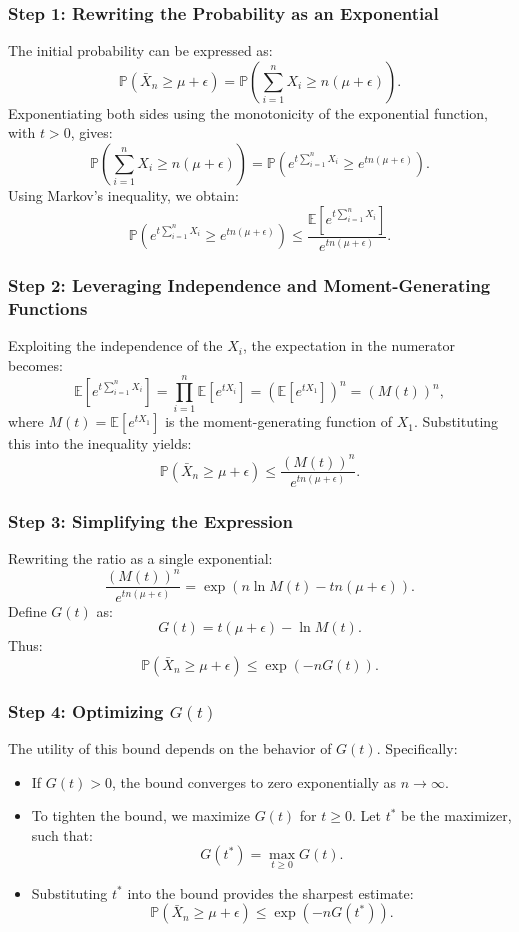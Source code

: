 \subsubsection{Step 1: Rewriting the Probability as an Exponential}
The initial probability can be expressed as:
\[
\mathbb{P}(\bar{X}_n \geq \mu + \epsilon) = \mathbb{P}\left(\sum_{i=1}^n X_i \geq n(\mu + \epsilon)\right).
\]
Exponentiating both sides using the monotonicity of the exponential function, with $t>0$, gives:
\[
\mathbb{P}\left(\sum_{i=1}^n X_i \geq n(\mu + \epsilon)\right) = \mathbb{P}\left(e^{t \sum_{i=1}^n X_i} \geq e^{t n (\mu + \epsilon)}\right).
\]
Using Markov's inequality, we obtain:
\[
\mathbb{P}\left(e^{t \sum_{i=1}^n X_i} \geq e^{t n (\mu + \epsilon)}\right) \leq \frac{\mathbb{E}[e^{t \sum_{i=1}^n X_i}]}{e^{t n (\mu + \epsilon)}}.
\]

\subsubsection{Step 2: Leveraging Independence and Moment-Generating Functions}
Exploiting the independence of the \( X_i \), the expectation in the numerator becomes:
\[
\mathbb{E}\left[e^{t \sum_{i=1}^n X_i}\right] = \prod_{i=1}^n \mathbb{E}\left[e^{t X_i}\right] = \left(\mathbb{E}[e^{t X_1}]\right)^n = \left(M(t)\right)^n,
\]
where \( M(t) = \mathbb{E}[e^{t X_1}] \) is the moment-generating function of \( X_1 \). Substituting this into the inequality yields:
\[
\mathbb{P}(\bar{X}_n \geq \mu + \epsilon) \leq \frac{\left(M(t)\right)^n}{e^{t n (\mu + \epsilon)}}.
\]

\subsubsection{Step 3: Simplifying the Expression}
Rewriting the ratio as a single exponential:
\[
\frac{\left(M(t)\right)^n}{e^{t n (\mu + \epsilon)}} = \exp\left(n \ln M(t) - t n (\mu + \epsilon)\right).
\]
Define \( G(t) \) as:
\[
G(t) = t (\mu + \epsilon) - \ln M(t).
\]
Thus:
\[
\mathbb{P}(\bar{X}_n \geq \mu + \epsilon) \leq \exp\left(-n G(t)\right).
\]

\subsubsection{Step 4: Optimizing \( G(t) \)}
The utility of this bound depends on the behavior of \( G(t) \). Specifically:
\begin{itemize}
    \item If \( G(t) > 0 \), the bound converges to zero exponentially as \( n \to \infty \).
    \item To tighten the bound, we maximize \( G(t) \) for \( t \geq 0 \). Let \( t^* \) be the maximizer, such that:
    \[
    G(t^*) = \max_{t \geq 0} G(t).
    \]
    \item Substituting \( t^* \) into the bound provides the sharpest estimate:
    \[
    \mathbb{P}(\bar{X}_n \geq \mu + \epsilon) \leq \exp\left(-n G(t^*)\right).
    \]
\end{itemize}


